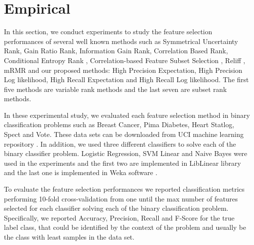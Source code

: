 \section{Empirical}
In this section, we conduct experiments to study the feature selection performances of several well known methods such as Symmetrical Uncertainty Rank, Gain Ratio Rank, Information Gain Rank, Correlation Based Rank, Conditional Entropy Rank \cite{guyon_jmlr03}, Correlation-based Feature Subset Selection \cite{Hall1998},  Reliff \cite{Robnik-Sikonja2003} , mRMR \cite{peng2005} and our proposed methods: High Precision Expectation, High Precision Log likelihood, High Recall Expectation and High Recall Log likelihood. The first five methods are variable rank methods and the last seven are subset rank methods. 

In these experimental study, we evaluated each feature selection method in binary classification problems such as Breast Cancer, Pima Diabetes, Heart Statlog, Spect and Vote. These data sets can be downloaded from UCI machine learning repository \cite{Bache+Lichman:2013}. In addition, we used three different classifiers to solve each of the binary classifier problem. Logistic Regression, SVM Linear and Naive Bayes were used in the experiments and the first two are implemented in LibLinear library \cite{REF08a} and the last one is implemented in Weka software \cite{weka}.
 
To evaluate the feature selection performances we reported classification metrics performing 10-fold cross-validation from one until the max number of features selected for each classifier solving each of the binary classification problem. Specifically, we reported Accuracy, Precision, Recall and F-Score for the true label class, that could be identified by the context of the problem and usually be the class with least samples in the data set.